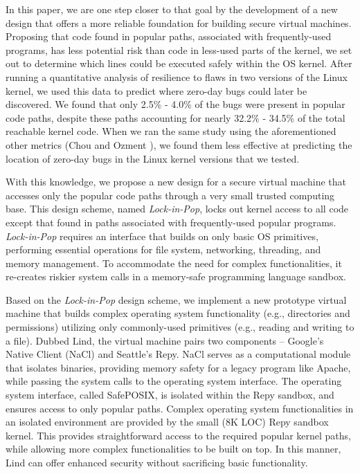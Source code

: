 In this paper, we are one step closer to that goal by the development 
of a new design that offers a more reliable foundation for building secure virtual machines. 
Proposing that code found in popular paths, associated with frequently-used programs, 
has less potential risk than code in less-used parts of the kernel, we set out to determine 
which lines could be executed safely within the OS kernel. 
After running a quantitative analysis of resilience to flaws in two versions of the Linux kernel, 
we used this data to predict where zero-day bugs could later be discovered. 
We found that only 2.5\% - 4.0\% of the bugs were present in popular code paths, 
despite these paths accounting for nearly 32.2\% - 34.5\% of the total reachable kernel code. 
When we ran the same study using the aforementioned other metrics (Chou \cite{PittSFIeld} and Ozment \cite{ozment2006milk}), 
we found them less  effective at predicting the location of zero-day bugs in the Linux kernel versions that we tested.

With this knowledge, we propose a new design for a secure virtual machine that 
accesses only the popular code paths through a very small trusted computing base. 
This design scheme, named \emph{Lock-in-Pop}, locks out kernel access to all code except 
that found in paths associated with frequently-used popular programs. \emph{Lock-in-Pop} requires an interface 
that builds on only basic OS primitives, performing essential operations for file system, 
networking, threading, and memory management. 
To accommodate the need for complex functionalities, it re-creates riskier system calls in 
a memory-safe programming language sandbox.

Based on the \emph{Lock-in-Pop} design scheme, we implement a new prototype virtual machine that 
builds complex operating system functionality (e.g., directories and permissions) utilizing only commonly-used primitives (e.g., reading and writing to a file). 
Dubbed Lind, the virtual machine pairs two components -- Google's Native Client (NaCl) and Seattle's Repy. 
NaCl serves as a computational module that isolates binaries, providing memory safety for a legacy program like Apache, 
while passing the system calls  to the operating system interface. 
The operating system interface, called SafePOSIX, is isolated within the Repy sandbox, and ensures access to only popular paths. 
Complex operating system functionalities in an isolated environment are provided by the small (8K LOC) Repy sandbox kernel. 
This provides straightforward access to the required popular kernel paths, 
while allowing more complex functionalities to be built on top. 
In this manner, Lind can offer enhanced security without sacrificing basic functionality. 

